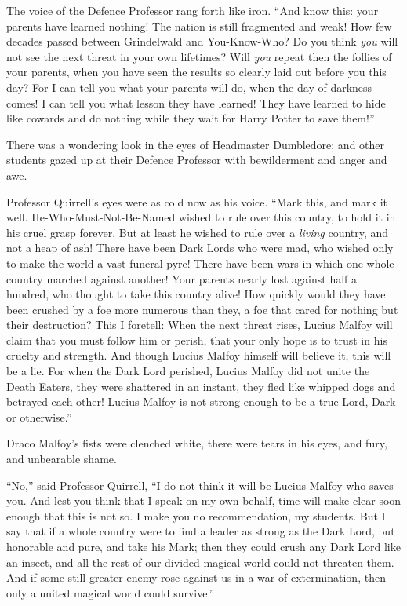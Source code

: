 The voice of the Defence Professor rang forth like iron. ``And know
this: your parents have learned nothing! The nation is still fragmented
and weak! How few decades passed between Grindelwald and You-Know-Who?
Do you think \emph{you} will not see the next threat in your own
lifetimes? Will \emph{you} repeat then the follies of your parents, when
you have seen the results so clearly laid out before you this day? For I
can tell you what your parents will do, when the day of darkness comes!
I can tell you what lesson they have learned! They have learned to hide
like cowards and do nothing while they wait for Harry Potter to save
them!''

There was a wondering look in the eyes of Headmaster Dumbledore; and
other students gazed up at their Defence Professor with bewilderment and
anger and awe.

Professor Quirrell's eyes were as cold now as his voice. ``Mark this,
and mark it well. He-Who-Must-Not-Be-Named wished to rule over this
country, to hold it in his cruel grasp forever. But at least he wished
to rule over a \emph{living} country, and not a heap of ash! There have
been Dark Lords who were mad, who wished only to make the world a vast
funeral pyre! There have been wars in which one whole country marched
against another! Your parents nearly lost against half a hundred, who
thought to take this country alive! How quickly would they have been
crushed by a foe more numerous than they, a foe that cared for nothing
but their destruction? This I foretell: When the next threat rises,
Lucius Malfoy will claim that you must follow him or perish, that your
only hope is to trust in his cruelty and strength. And though Lucius
Malfoy himself will believe it, this will be a lie. For when the Dark
Lord perished, Lucius Malfoy did not unite the Death Eaters, they were
shattered in an instant, they fled like whipped dogs and betrayed each
other! Lucius Malfoy is not strong enough to be a true Lord, Dark or
otherwise.''

Draco Malfoy's fists were clenched white, there were tears in his eyes,
and fury, and unbearable shame.

``No,'' said Professor Quirrell, ``I do not think it will be Lucius
Malfoy who saves you. And lest you think that I speak on my own behalf,
time will make clear soon enough that this is not so. I make you no
recommendation, my students. But I say that if a whole country were to
find a leader as strong as the Dark Lord, but honorable and pure, and
take his Mark; then they could crush any Dark Lord like an insect, and
all the rest of our divided magical world could not threaten them. And
if some still greater enemy rose against us in a war of extermination,
then only a united magical world could survive.''

